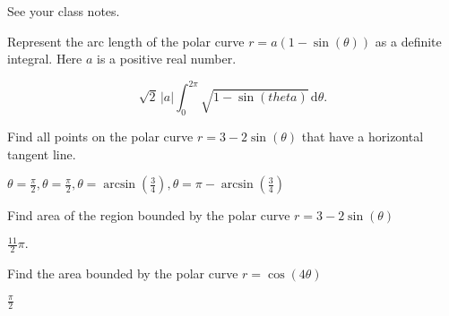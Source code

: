 \documentclass[12pt,fleqn,answers]{exam}
\begin{document}
\begin{questions}
\begin{solution}%
  See your class notes.
\end{solution}

\newpage 
\question Represent the arc length of the polar curve $r = a (1-\sin(\theta))$
as a definite integral. Here $a$ is a positive real number.

\begin{solution}[3.5in]
  $$
  \sqrt{2}\, \left| a\right|  \int_0^{2 \pi}   \sqrt{1-\sin{(theta)}}
  \, \mathrm{d} \theta.
  $$
\end{solution}

\question Find all points on the polar curve $r = 3 - 2 \sin(\theta)$
that have a horizontal tangent line.

\begin{solution}%
 $\theta= \frac{\pi}{2}, \theta= \frac{\pi}{2},
  \theta = \operatorname{arcsin}\left( \frac{3}{4}\right) ,
  \theta = \pi - \operatorname{arcsin}\left( \frac{3}{4}\right)$
\end{solution}

\newpage 
\question Find area of the region bounded by the  polar curve 
$r = 3 - 2 \sin(\theta)$

\begin{solution}[3.5in]
 $\frac{11}{2} \pi.$
\end{solution}

\question Find the area bounded by the polar curve $r = \cos(4 \theta)$
\begin{solution}[3.5in]
  $\frac{\pi}{2}$
\end{solution}




\end{questions}

    
\end{document}

